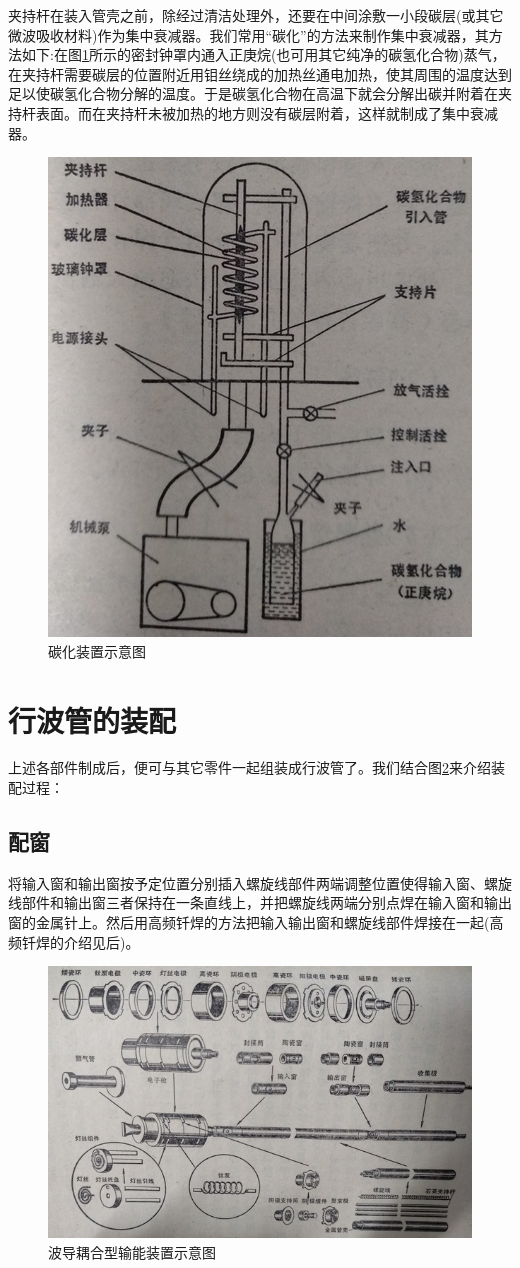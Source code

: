 夹持杆在装入管壳之前，除经过清洁处理外，还要在中间涂敷一小段碳层(或其它微波吸收材料)作为集中衰减器。我们常用“碳化”的方法来制作集中衰减器，其方法如下:在图\ref{ch10-11}所示的密封钟罩内通入正庚烷(也可用其它纯净的碳氢化合物)蒸气，在夹持杆需要碳层的位置附近用钼丝绕成的加热丝通电加热，使其周围的温度达到足以使碳氢化合物分解的温度。于是碳氢化合物在高温下就会分解出碳并附着在夹持杆表面。而在夹持杆未被加热的地方则没有碳层附着，这样就制成了集中衰减器。
\begin{figure}[phtb]
	\centering
	\includegraphics[width=0.52\linewidth]{figure/ch10-11}
	\caption{ 碳化装置示意图}
	\label{ch10-11}
\end{figure}
\section{行波管的装配}
上述各部件制成后，便可与其它零件一起组装成行波管了。我们结合图\ref{ch10-12}来介绍装配过程：

\subsection{配窗}

将输入窗和输出窗按予定位置分别插入螺旋线部件两端调整位置使得输入窗、螺旋线部件和输出窗三者保持在一条直线上，并把螺旋线两端分别点焊在输入窗和输出窗的金属针上。然后用高频钎焊的方法把输入输出窗和螺旋线部件焊接在一起(高频钎焊的介绍见后)。




\begin{figure}[phtb]
	\centering
	\includegraphics[angle=90]{figure/ch10-12}
	\caption{ 波导耦合型输能装置示意图}
	\label{ch10-12}
\end{figure}




